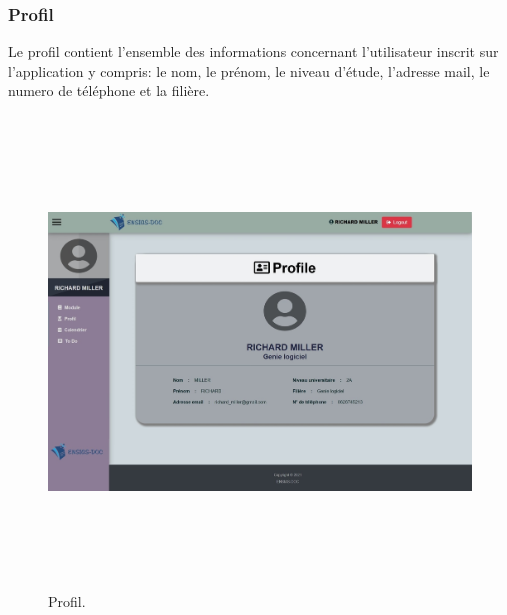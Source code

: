 \documentclass{article}
\begin{document}
{\subsubsection{Profil}{Le profil contient l'ensemble des informations concernant l'utilisateur inscrit sur l'application y compris: le nom, le prénom, le niveau d'étude, l'adresse mail, le numero de téléphone et la filière.
}
\vspace{1.5cm}

\begin{figure}[H]
    \centering
    \includegraphics[width=17cm,height=12.5cm]{profil.jpeg}
    \caption{Profil.}
    \label{Profil.}
\end{figure}


}
\end{document}
